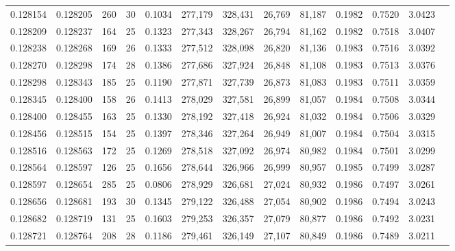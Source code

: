 \begin{tabular}{rrrrrrrrrrrrr}
0.128154 & 0.128205 & 260 &  30 &                                     0.1034 & 277,179 & 328,431 &  26,769 &  81,187 & 0.1982 & 0.7520 & 3.0423 \\
0.128209 & 0.128237 & 164 &  25 &                                     0.1323 & 277,343 & 328,267 &  26,794 &  81,162 & 0.1982 & 0.7518 & 3.0407 \\
0.128238 & 0.128268 & 169 &  26 &                                     0.1333 & 277,512 & 328,098 &  26,820 &  81,136 & 0.1983 & 0.7516 & 3.0392 \\
0.128270 & 0.128298 & 174 &  28 &                                     0.1386 & 277,686 & 327,924 &  26,848 &  81,108 & 0.1983 & 0.7513 & 3.0376 \\
0.128298 & 0.128343 & 185 &  25 &                                     0.1190 & 277,871 & 327,739 &  26,873 &  81,083 & 0.1983 & 0.7511 & 3.0359 \\
0.128345 & 0.128400 & 158 &  26 &                                     0.1413 & 278,029 & 327,581 &  26,899 &  81,057 & 0.1984 & 0.7508 & 3.0344 \\
0.128400 & 0.128455 & 163 &  25 &                                     0.1330 & 278,192 & 327,418 &  26,924 &  81,032 & 0.1984 & 0.7506 & 3.0329 \\
0.128456 & 0.128515 & 154 &  25 &                                     0.1397 & 278,346 & 327,264 &  26,949 &  81,007 & 0.1984 & 0.7504 & 3.0315 \\
0.128516 & 0.128563 & 172 &  25 &                                     0.1269 & 278,518 & 327,092 &  26,974 &  80,982 & 0.1984 & 0.7501 & 3.0299 \\
0.128564 & 0.128597 & 126 &  25 &                                     0.1656 & 278,644 & 326,966 &  26,999 &  80,957 & 0.1985 & 0.7499 & 3.0287 \\
0.128597 & 0.128654 & 285 &  25 &                                     0.0806 & 278,929 & 326,681 &  27,024 &  80,932 & 0.1986 & 0.7497 & 3.0261 \\
0.128656 & 0.128681 & 193 &  30 &                                     0.1345 & 279,122 & 326,488 &  27,054 &  80,902 & 0.1986 & 0.7494 & 3.0243 \\
0.128682 & 0.128719 & 131 &  25 &                                     0.1603 & 279,253 & 326,357 &  27,079 &  80,877 & 0.1986 & 0.7492 & 3.0231 \\
0.128721 & 0.128764 & 208 &  28 &                                     0.1186 & 279,461 & 326,149 &  27,107 &  80,849 & 0.1986 & 0.7489 & 3.0211 \\

\end{tabular}
